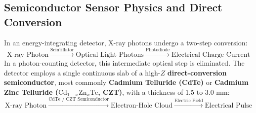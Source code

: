 \documentclass[11pt,a4paper]{article}
\begin{document}
\subsection{Semiconductor Sensor Physics and Direct Conversion}
In an energy-integrating detector, X-ray photons undergo a two-step conversion:
\begin{equation}
    \text{X-ray Photon} \xrightarrow{\text{Scintillator}} \text{Optical Light Photons} \xrightarrow{\text{Photodiode}} \text{Electrical Charge Current}
\end{equation}
In a photon-counting detector, this intermediate optical step is eliminated. The detector employs a single continuous slab of a high-$Z$ \textbf{direct-conversion semiconductor}, most commonly \textbf{Cadmium Telluride (CdTe)} or \textbf{Cadmium Zinc Telluride ($\text{Cd}_{1-x}\text{Zn}_x\text{Te}$, CZT)}, with a thickness of $1.5\text{ to }3.0\text{ mm}$:
\begin{equation}
    \text{X-ray Photon} \xrightarrow{\text{CdTe / CZT Semiconductor}} \text{Electron-Hole Cloud} \xrightarrow{\text{Electric Field}} \text{Electrical Pulse}
\end{equation}
\end{document}
